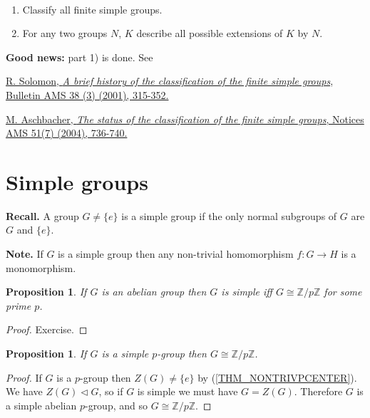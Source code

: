 \documentclass[12pt, letterpaper, oneside]{article}
\theoremstyle{plain}
\newtheorem{proposition}[theorem]{Proposition}
\theoremstyle{definition}
\newcommand{\Z}{{\mathbb Z}}
\newcommand{\benu}{\begin{enumerate}}
\newcommand{\eenu}{\end{enumerate}}
\newcommand{\vs}{\vskip 5mm}
\begin{document}
\vskip -8mm

\ 
\benu
\item Classify all finite simple groups. 
\item For any two groups $N$, $K$ describe all possible extensions of $K$ by $N$.
\eenu

\textbf{Good news:} part 1) is done. See 

\href{http://www.ams.org/journals/bull/2001-38-03/S0273-0979-01-00909-0/S0273-0979-01-00909-0.pdf}
{
R. Solomon, \emph{A brief history of the classification of the finite simple groups}, 
Bulletin AMS 38 (3) (2001), 315-352.
}

\vskip -1mm

\href{http://www.ams.org/notices/200407/fea-aschbacher.pdf}
{
M. Aschbacher,  \emph{The status of the classification of the finite simple groups}, 
Notices AMS 51(7) (2004), 736-740.
}




\newpage
\section{Simple groups}
\label{SEC_SIMPLEGPS}


\textbf{Recall.} A group $G\neq\{e\}$ is a simple group if  the only normal subgroups 
of $G$ are $G$ and $\{e\}$.

\vs

\textbf{Note.} If $G$ is a simple group then any non-trivial homomorphism $f\colon G\to H$
is a monomorphism. 

\vs\vs

\begin{proposition}
If $G$ is an abelian group then $G$ is simple iff $G\cong \Z/p\Z$ for some prime $p$.
\end{proposition}



\begin{proof}
Exercise.
\end{proof}



\vs\vs

\begin{proposition}
\label{PROP_SIMPLEPGP}
If $G$ is a simple $p$-group then $G\cong \Z/p\Z$.
\end{proposition}

\begin{proof}
If $G$ is a $p$-group then $Z(G) \neq \{e\}$ by (\ref {THM_NONTRIVPCENTER}). 
We have $Z(G) \lhd G$, so if $G$ is simple we must have $G = Z(G)$. Therefore 
$G$ is a simple abelian $p$-group, and so $G\cong \Z/p\Z$.  
\end{proof}
\end{document}
